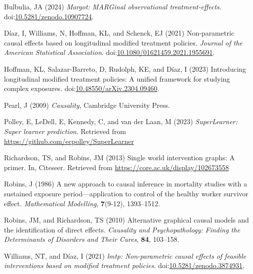 \documentclass[
  single column]{article}
\newlength{\cslhangindent}
\newenvironment{CSLReferences}[2] %
 {\begin{list}{}{%
  \setlength{\itemindent}{0pt}
  \setlength{\leftmargin}{0pt}
  \setlength{\parsep}{0pt}
  \ifodd #1
   \setlength{\leftmargin}{\cslhangindent}
   \setlength{\itemindent}{-1\cslhangindent}
  \fi
  \setlength{\itemsep}{#2\baselineskip}}}
 {\end{list}}
\begin{document}
\label{refs}
\begin{CSLReferences}{1}{0}
Bulbulia, JA (2024) \emph{Margot: MARGinal observational
treatment-effects}.
doi:\href{https://doi.org/10.5281/zenodo.10907724}{10.5281/zenodo.10907724}.

Díaz, I, Williams, N, Hoffman, KL, and Schenck, EJ (2021) Non-parametric
causal effects based on longitudinal modified treatment policies.
\emph{Journal of the American Statistical Association}.
doi:\href{https://doi.org/10.1080/01621459.2021.1955691}{10.1080/01621459.2021.1955691}.

Hoffman, KL, Salazar-Barreto, D, Rudolph, KE, and Díaz, I (2023)
Introducing longitudinal modified treatment policies: A unified
framework for studying complex exposures.
doi:\href{https://doi.org/10.48550/arXiv.2304.09460}{10.48550/arXiv.2304.09460}.

Pearl, J (2009) \emph{Causality}, Cambridge University Press.

Polley, E, LeDell, E, Kennedy, C, and van der Laan, M (2023)
\emph{SuperLearner: Super learner prediction}. Retrieved from
\url{https://github.com/ecpolley/SuperLearner}

Richardson, TS, and Robins, JM (2013) Single world intervention graphs:
A primer. In, Citeseer. Retrieved from
\url{https://core.ac.uk/display/102673558}

Robins, J (1986) A new approach to causal inference in mortality studies
with a sustained exposure period---application to control of the healthy
worker survivor effect. \emph{Mathematical Modelling}, \textbf{7}(9-12),
1393--1512.

Robins, JM, and Richardson, TS (2010) Alternative graphical causal
models and the identification of direct effects. \emph{Causality and
Psychopathology: Finding the Determinants of Disorders and Their Cures},
\textbf{84}, 103--158.

Williams, NT, and Díaz, I (2021) \emph{{l}mtp: Non-parametric causal
effects of feasible interventions based on modified treatment policies}.
doi:\href{https://doi.org/10.5281/zenodo.3874931}{10.5281/zenodo.3874931}.

\end{CSLReferences}
\end{document}

